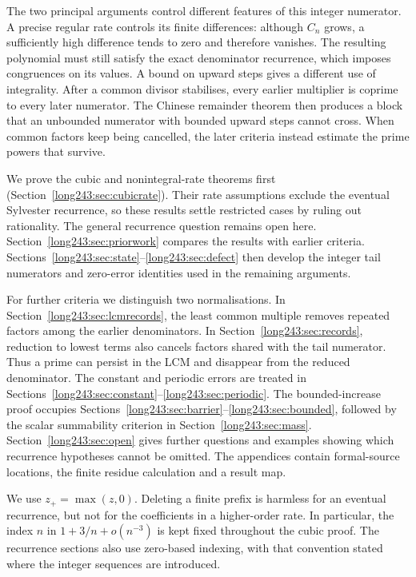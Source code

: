 \documentclass[11pt]{article}
\begin{document}
The two principal arguments control different features of this integer
numerator. A precise regular rate controls its finite differences:
although $C_n$ grows, a sufficiently high difference tends to zero and
therefore vanishes. The resulting polynomial must still satisfy the
exact denominator recurrence, which imposes congruences on its values.
A bound on upward steps gives a different use of integrality. After a
common divisor stabilises, every earlier multiplier is coprime to every
later numerator. The Chinese remainder theorem then produces a block
that an unbounded numerator with bounded upward steps cannot cross.
When common factors keep being cancelled, the later criteria instead
estimate the prime powers that survive.

We prove the cubic and nonintegral-rate theorems first
(Section~\ref{long243:sec:cubicrate}). Their rate assumptions exclude
the eventual Sylvester recurrence, so these results settle restricted cases by ruling out
rationality. The general recurrence question remains open here.
Section~\ref{long243:sec:priorwork} compares the results with earlier
criteria. Sections~\ref{long243:sec:state}--\ref{long243:sec:defect}
then develop the integer tail numerators and zero-error identities used in the
remaining arguments.

For further criteria we distinguish two normalisations. In
Section~\ref{long243:sec:lcmrecords}, the least common multiple removes
repeated factors among the earlier denominators. In
Section~\ref{long243:sec:records}, reduction to lowest terms also
cancels factors shared with the tail numerator. Thus a prime can persist
in the LCM and disappear from the reduced denominator. The constant
and periodic errors are treated in
Sections~\ref{long243:sec:constant}--\ref{long243:sec:periodic}.
The bounded-increase proof occupies
Sections~\ref{long243:sec:barrier}--\ref{long243:sec:bounded}, followed
by the scalar summability criterion in Section~\ref{long243:sec:mass}.
Section~\ref{long243:sec:open} gives further questions and examples
showing which recurrence hypotheses cannot be omitted. The appendices
contain formal-source locations, the finite residue calculation and a
result map.

We use $z_+=\max(z,0)$. Deleting a finite prefix is harmless for an eventual
recurrence, but not for the coefficients in a higher-order rate. In
particular, the index $n$ in $1+3/n+o(n^{-3})$ is kept fixed throughout
the cubic proof. The recurrence sections also use zero-based indexing,
with that convention stated where the integer sequences are introduced.
\end{document}
